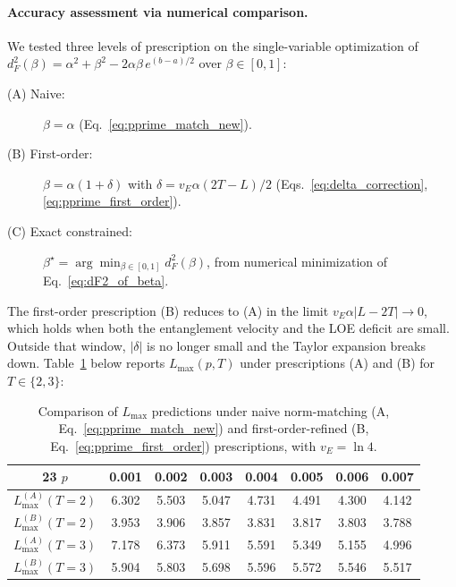 \documentclass[%
 reprint,
superscriptaddress,
 amsmath,amssymb,
 aps,
]{revtex4-2}
\begin{document}
\paragraph*{Accuracy assessment via numerical comparison.}
We tested three levels of prescription on the single-variable optimization of $d_F^2(\beta) = \alpha^2+\beta^2 - 2\alpha\beta\,e^{(b-a)/2}$ over $\beta\in[0,1]$:
\begin{description}
    \item[\textnormal{(A) Naive:}] $\beta=\alpha$ (Eq.~\eqref{eq:pprime_match_new}).
    \item[\textnormal{(B) First-order:}] $\beta=\alpha(1+\delta)$ with $\delta = v_E\alpha(2T-L)/2$ (Eqs.~\eqref{eq:delta_correction}, \eqref{eq:pprime_first_order}).
    \item[\textnormal{(C) Exact constrained:}] $\beta^\star = \arg\min_{\beta\in[0,1]} d_F^2(\beta)$, from numerical minimization of Eq.~\eqref{eq:dF2_of_beta}.
\end{description}

The first-order prescription (B) reduces to (A) in the limit $v_E\alpha|L-2T|\to 0$, which holds when both the entanglement velocity and the LOE deficit are small. Outside that window, $|\delta|$ is no longer small and the Taylor expansion breaks down. Table~\ref{tab:L_max_comparison} below reports $L_{\max}(p,T)$ under prescriptions (A) and (B) for $T\in\{2,3\}$:

\begin{table}[]
    \centering
    \begin{tabular}{|c|c|c|c|c|c|c|c|}
    \hline
23       $p$ & 0.001 & 0.002 & 0.003 & 0.004 & 0.005 & 0.006 & 0.007 \\
       \hline
       $L_{\max}^{(A)}(T=2)$ & 6.302 & 5.503 & 5.047 & 4.731 & 4.491 & 4.300 & 4.142 \\
       $L_{\max}^{(B)}(T=2)$ & 3.953 & 3.906 & 3.857 & 3.831 & 3.817 & 3.803 & 3.788 \\
       \hline
       $L_{\max}^{(A)}(T=3)$ & 7.178 & 6.373 & 5.911 & 5.591 & 5.349 & 5.155 & 4.996 \\
       $L_{\max}^{(B)}(T=3)$ & 5.904 & 5.803 & 5.698 & 5.596 & 5.572 & 5.546 & 5.517 \\
       \hline
    \end{tabular}
    \caption{Comparison of $L_{\max}$ predictions under naive norm-matching (A, Eq.~\eqref{eq:pprime_match_new}) and first-order-refined (B, Eq.~\eqref{eq:pprime_first_order}) prescriptions, with $v_E=\ln 4$.}
    \label{tab:L_max_comparison}
\end{table}
\end{document}
